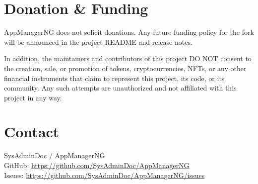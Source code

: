 \section{Donation \& Funding}\label{sec:donation-&-funding} %
%
%
%
%

AppManagerNG does not solicit donations. Any future funding policy for the fork will be announced in the project README
and release notes.

In addition, the maintainers and contributors of this project DO NOT consent to the creation, sale,
or promotion of tokens, cryptocurrencies, NFTs, or any other financial instruments that claim to
represent this project, its code, or its community. Any such attempts are unauthorized and not
affiliated with this project in any way.

\section{Contact}\label{sec:contact} %
SysAdminDoc / AppManagerNG\\
GitHub: \url{https://github.com/SysAdminDoc/AppManagerNG}\\
Issues: \url{https://github.com/SysAdminDoc/AppManagerNG/issues}
